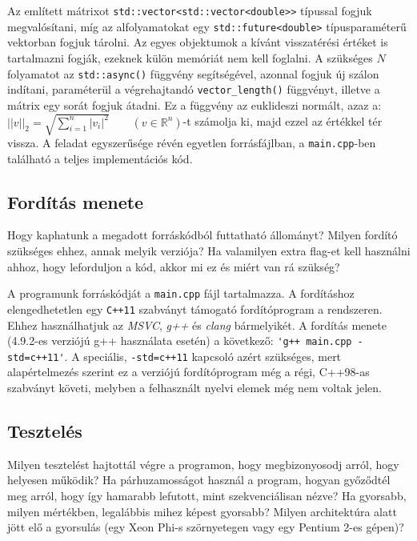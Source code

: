 \documentclass[12pt]{article}
\begin{document}
Az említett mátrixot \verb|std::vector<std::vector<double>>| típussal fogjuk megvalósítani, míg az alfolyamatokat egy \verb|std::future<double>| típusparaméterű vektorban fogjuk tárolni. Az egyes objektumok a kívánt visszatérési értéket is tartalmazni fogják, ezeknek külön memóriát nem kell foglalni. A szükséges $N$ folyamatot az \verb|std::async()| függvény segítségével, azonnal fogjuk új szálon indítani, paraméterül a végrehajtandó \verb|vector_length()| függvényt, illetve a mátrix egy sorát fogjuk átadni. Ez a függvény az euklideszi normált, azaz a:\\
$ ||v||_{2} = \sqrt{ \sum\limits_{i=1}^{n} |v_{i}|^2} \qquad (v \in \mathbb{R}^{n})$-t számolja ki, majd ezzel az értékkel tér vissza. A feladat egyszerűsége révén egyetlen forrásfájlban, a \verb|main.cpp|-ben található a teljes implementációs kód.


\subsection{Fordítás menete}

\begin{itshape}
Hogy kaphatunk a megadott forráskódból futtatható állományt? Milyen fordító szükséges ehhez, annak melyik verziója? Ha valamilyen extra flag-et kell használni ahhoz, hogy leforduljon a kód, akkor mi ez és miért van rá szükség?\\
\end{itshape}

A programunk forráskódját a \verb|main.cpp| fájl tartalmazza. A fordításhoz elengedhetetlen egy \verb|C++11| szabványt támogató fordítóprogram a rendszeren. Ehhez használhatjuk az \textit{MSVC}, \textit{g++} és \textit{clang} bármelyikét. A fordítás menete (4.9.2-es verziójú g++ használata esetén) a következő: \verb|'g++ main.cpp -std=c++11'|. A speciális, \verb|-std=c++11| kapcsoló azért szükséges, mert alapértelmezés szerint ez a verziójú fordítóprogram még a régi, C++98-as szabványt követi, melyben a felhasznált nyelvi elemek még nem voltak jelen.


\subsection{Tesztelés}

\begin{itshape}
Milyen tesztelést hajtottál végre a programon, hogy megbizonyosodj arról, hogy helyesen működik? Ha párhuzamosságot használ a program, hogyan győződtél meg arról, hogy így hamarabb lefutott, mint szekvenciálisan nézve? Ha gyorsabb, milyen mértékben, legalábbis mihez képest gyorsabb? Milyen architektúra alatt jött elő a gyorsulás (egy Xeon Phi-s szörnyetegen vagy egy Pentium 2-es gépen)? \\
\end{itshape}
\end{document}
